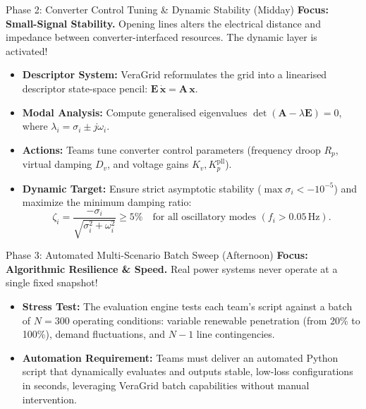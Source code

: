 \documentclass[11pt,a4paper]{article}
\begin{document}
\begin{challengebox}{Phase 2: Converter Control Tuning \& Dynamic Stability (Midday)}
  \textbf{Focus: Small-Signal Stability.} Opening lines alters the electrical distance and impedance between converter-interfaced resources. The dynamic layer is activated!
  \begin{itemize}[leftmargin=*, itemsep=1pt]
    \item \textbf{Descriptor System:} VeraGrid reformulates the grid into a linearised descriptor state-space pencil: $\mathbf{E}\,\dot{\mathbf{x}} = \mathbf{A}\,\mathbf{x}$.
    \item \textbf{Modal Analysis:} Compute generalised eigenvalues $\det(\mathbf{A} - \lambda \mathbf{E}) = 0$, where $\lambda_i = \sigma_i \pm j\omega_i$.
    \item \textbf{Actions:} Teams tune converter control parameters (frequency droop $R_p$, virtual damping $D_v$, and voltage gains $K_v, K_p^{\text{pll}}$).
    \item \textbf{Dynamic Target:} Ensure strict asymptotic stability ($\max \sigma_i < -10^{-5}$) and maximize the minimum damping ratio:
    \begin{equation*}
      \zeta_i = \frac{-\sigma_i}{\sqrt{\sigma_i^2 + \omega_i^2}} \ge 5\% \quad \text{for all oscillatory modes } (f_i > 0.05\,\text{Hz}).
    \end{equation*}
  \end{itemize}
\end{challengebox}

\begin{challengebox}{Phase 3: Automated Multi-Scenario Batch Sweep (Afternoon)}
  \textbf{Focus: Algorithmic Resilience \& Speed.} Real power systems never operate at a single fixed snapshot!
  \begin{itemize}[leftmargin=*, itemsep=1pt]
    \item \textbf{Stress Test:} The evaluation engine tests each team's script against a batch of $N = 300$ operating conditions: variable renewable penetration (from 20\% to 100\%), demand fluctuations, and $N-1$ line contingencies.
    \item \textbf{Automation Requirement:} Teams must deliver an automated Python script that dynamically evaluates and outputs stable, low-loss configurations in seconds, leveraging VeraGrid batch capabilities without manual intervention.
  \end{itemize}
\end{challengebox}
\end{document}
